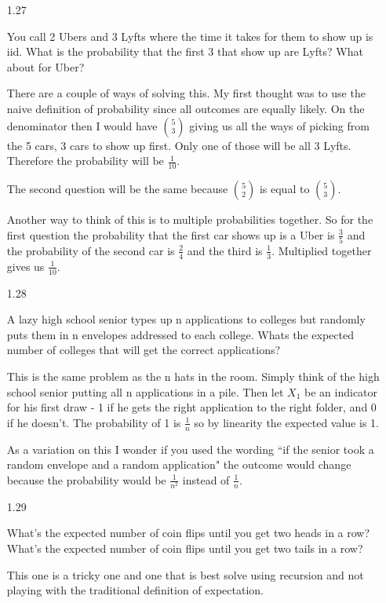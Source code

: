 \begin{enumerate}
\item[1.27]

You call 2 Ubers and 3 Lyfts where the time it takes for them to show up is iid. What is the probability that the first 3 that show up are Lyfts? What about for Uber?

There are a couple of ways of solving this. My first thought was to use the naive definition of probability since all outcomes are equally likely. On the denominator then I would have ${5 \choose 3}$ giving us all the ways of picking from the 5 cars, 3 cars to show up first. Only one of those will be all 3 Lyfts. Therefore the probability will be $\frac{1}{10}$.

The second question will be the same because ${5 \choose 2}$ is equal to ${5 \choose 3}$.

Another way to think of this is to multiple probabilities together. So for the first question the probability that the first car shows up is a Uber is $\frac{3}{5}$ and the probability of the second car is $\frac{2}{4}$ and the third is $\frac{1}{3}$. Multiplied together gives us $\frac{1}{10}$.

\item[1.28]

A lazy high school senior types up n applications to colleges but randomly puts them in n envelopes addressed to each college. Whats the expected number of colleges that will get the correct applications?

This is the same problem as the n hats in the room. Simply think of the high school senior putting all n applications in a pile. Then let $X_1$ be an indicator for his first draw - 1 if he gets the right application to the right folder, and 0 if he doesn't. The probability of 1 is $\frac{1}{n}$ so by linearity the expected value is 1.

As a variation on this I wonder if you used the wording ``if the senior took a random envelope and a random application" the outcome would change because the probability would be $\frac{1}{n^2}$ instead of $\frac{1}{n}$.

\item[1.29]

What’s the expected number of coin flips until you get two heads in a row? What’s the expected number of coin flips until you get two tails in a row?

This one is a tricky one and one that is best solve using recursion and not playing with the traditional definition of expectation.


\end{enumerate}
